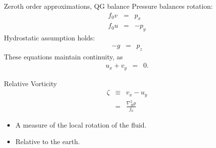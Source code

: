 \documentclass[a4paper]{beamer}
\begin{document}
\begin{frame}{Zeroth order approximations, QG balance}
Pressure balances rotation:
\begin{eqnarray}
f_0v & = &  p_x\\
f_0u & = & -p_y
\end{eqnarray}
Hydrostatic assumption holds:
\begin{eqnarray}
-g & = & p_z
\end{eqnarray}
These equations maintain continuity, as
\begin{eqnarray}
u_x + v_y & = & 0.
\end{eqnarray}
\end{frame}

\begin{frame}{Relative Vorticity}
\begin{eqnarray}
\zeta & \equiv & v_x - u_y\\
    & = & \frac{\nabla^2_Hp}{f_0}
\end{eqnarray}
\begin{itemize}
\item A measure of the local rotation of the fluid.
\item Relative to the earth.
\end{itemize}
\end{frame}
\end{document}
